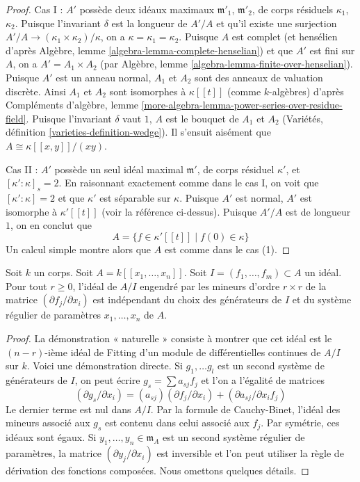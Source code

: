 \begin{proof}
\medskip\noindent
Cas I : $A'$ possède deux idéaux maximaux $\mathfrak m'_1$, $\mathfrak m'_2$, de corps résiduels $\kappa_1$, $\kappa_2$. Puisque l'invariant $\delta$ est la longueur de $A'/A$ et qu'il existe une surjection $A'/A \to (\kappa_1 \times \kappa_2)/\kappa$, on a $\kappa = \kappa_1 = \kappa_2$. Puisque $A$ est complet (et hensélien d'après Algèbre, lemme \ref{algebra-lemma-complete-henselian}) et que $A'$ est fini sur $A$, on a $A' = A_1 \times A_2$ (par Algèbre, lemme \ref{algebra-lemma-finite-over-henselian}). Puisque $A'$ est un anneau normal, $A_1$ et $A_2$ sont des anneaux de valuation discrète. Ainsi $A_1$ et $A_2$ sont isomorphes à $\kappa[[t]]$ (comme $k$-algèbres) d'après Compléments d'algèbre, lemme \ref{more-algebra-lemma-power-series-over-residue-field}. Puisque l'invariant $\delta$ vaut $1$, $A$ est le bouquet de $A_1$ et $A_2$ (Variétés, définition \ref{varieties-definition-wedge}). Il s'ensuit aisément que $A \cong \kappa[[x, y]]/(xy)$.

\medskip\noindent
Cas II : $A'$ possède un seul idéal maximal $\mathfrak m'$, de corps résiduel $\kappa'$, et $[\kappa' : \kappa]_s = 2$. En raisonnant exactement comme dans le cas I, on voit que $[\kappa' : \kappa] = 2$ et que $\kappa'$ est séparable sur $\kappa$. Puisque $A'$ est normal, $A'$ est isomorphe à $\kappa'[[t]]$ (voir la référence ci-dessus). Puisque $A'/A$ est de longueur $1$, on en conclut que $$
A = \{f \in \kappa'[[t]] \mid f(0) \in \kappa\}
$$ Un calcul simple montre alors que $A$ est comme dans le cas (1).
\end{proof}

\begin{lemma}
\label{lemma-fitting-ideal-well-defined}
Soit $k$ un corps. Soit $A = k[[x_1, \ldots, x_n]]$. Soit $I = (f_1, \ldots, f_m) \subset A$ un idéal. Pour tout $r \geq 0$, l'idéal de $A/I$ engendré par les mineurs d'ordre $r \times r$ de la matrice $(\partial f_j/\partial x_i)$ est indépendant du choix des générateurs de $I$ et du système régulier de paramètres $x_1, \ldots, x_n$ de $A$.
\end{lemma}

\begin{proof}
La démonstration « naturelle » consiste à montrer que cet idéal est le $(n - r)$-ième idéal de Fitting d'un module de différentielles continues de $A/I$ sur $k$. Voici une démonstration directe. Si $g_1, \ldots g_l$ est un second système de générateurs de $I$, on peut écrire $g_s = \sum a_{sj}f_j$ et l'on a l'égalité de matrices $$
(\partial g_s/\partial x_i) = (a_{sj}) (\partial f_j/\partial x_i)
+ (\partial a_{sj}/\partial x_i f_j)
$$ Le dernier terme est nul dans $A/I$. Par la formule de Cauchy-Binet, l'idéal des mineurs associé aux $g_s$ est contenu dans celui associé aux $f_j$. Par symétrie, ces idéaux sont égaux. Si $y_1, \ldots, y_n \in \mathfrak m_A$ est un second système régulier de paramètres, la matrice $(\partial y_j/\partial x_i)$ est inversible et l'on peut utiliser la règle de dérivation des fonctions composées. Nous omettons quelques détails.
\end{proof}

